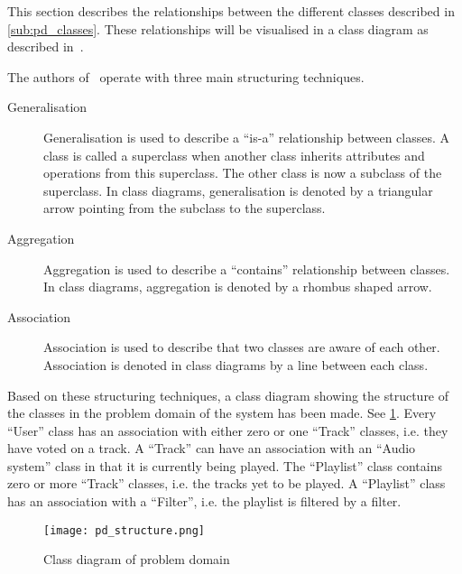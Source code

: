 This section describes the relationships between the different classes
described in \cref{sub:pd_classes}. These relationships will be
visualised in a class diagram as described
in~\cite{mathiassen2001objektorienteret}.

The authors of~\cite{mathiassen2001objektorienteret} operate with three
main structuring techniques.

\begin{description}
\item[Generalisation] Generalisation is used to describe a \enquote{is-a}
  relationship between classes. A class is called a
  superclass when another class inherits attributes and operations
  from this superclass. The other class is now a subclass of the
  superclass. In class diagrams, generalisation is denoted by a
  triangular arrow pointing from the subclass to the superclass.
\item[Aggregation] Aggregation is used to describe a
  \enquote{contains} relationship between classes. In class diagrams,
  aggregation is denoted by a rhombus shaped arrow.
\item[Association] Association is used to describe that two classes
  are aware of each other. Association is denoted in class diagrams by
  a line between each class.
\end{description}

Based on these structuring techniques, a class diagram showing the structure of the classes in the problem domain of the system has been made. See \cref{fig:pd_structure}. Every \enquote{User} class has an association with either zero or one \enquote{Track} classes, i.e. they have voted on a track. A \enquote{Track} can have an association with an \enquote{Audio system} class in that it is currently being played. The \enquote{Playlist} class contains zero or more \enquote{Track} classes, i.e. the tracks yet to be played. A \enquote{Playlist} class has an association with a \enquote{Filter}, i.e. the playlist is filtered by a filter.

\begin{figure}
  \centering
  \texttt{[image: pd\_structure.png]}
  \caption{Class diagram of problem domain}\label{fig:pd_structure}
\end{figure}

